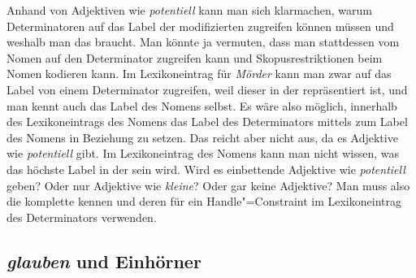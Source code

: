 \noindent
Anhand von Adjektiven wie \emph{potentiell} kann man sich klarmachen, warum Determinatoren auf das Label der
modifizierten \nbar zugreifen können müssen und weshalb man das \specm braucht. Man könnte ja
vermuten, dass man stattdessen vom Nomen auf den Determinator zugreifen kann und
Skopusrestriktionen beim Nomen kodieren kann. Im Lexikoneintrag für \emph{Mörder} kann man zwar
auf das Label von einem Determinator zugreifen, weil dieser in der \sprl repräsentiert ist, und man
kennt auch das Label des Nomens selbst. Es wäre also möglich, innerhalb des Lexikoneintrags des
Nomens das Label des Determinators mittels \qeq zum Label des Nomens in Beziehung zu setzen. Das
reicht aber nicht aus, da es Adjektive wie \emph{potentiell} gibt. Im Lexikoneintrag des Nomens
kann man nicht wissen, was das höchste Label in der \nbar sein wird. Wird es einbettende Adjektive
wie \emph{potentiell} geben? Oder nur Adjektive wie \emph{kleine}? Oder gar keine Adjektive? Man
muss also die komplette \nbar kennen und deren \ltopw für ein Handle"=Constraint im Lexikoneintrag
des Determinators verwenden. 

\subsection{\emph{glauben} und Einhörner}
\label{Abschnitt glauben und Einhörner}

